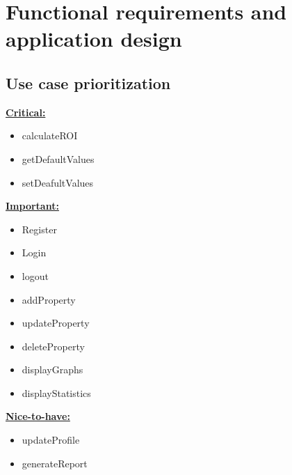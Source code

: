 \documentclass[a4paper,12pt]{article}
\begin{document}
\newpage
\section{Functional requirements and application design}

\subsection{Use case prioritization}
 \underline{\textbf{Critical:}}
	\begin{itemize}
		\item calculateROI
		\item getDefaultValues
		\item setDeafultValues
	\end{itemize}
\underline{\textbf{Important:}}
	\begin{itemize}
		\item Register
		\item Login
		\item logout
		\item addProperty
		\item updateProperty	
		\item deleteProperty
		\item displayGraphs
		\item displayStatistics	
	\end{itemize}
\underline{\textbf{Nice-to-have:}}
	\begin{itemize}
		\item updateProfile
		\item generateReport	
	\end{itemize}


\end{document}
